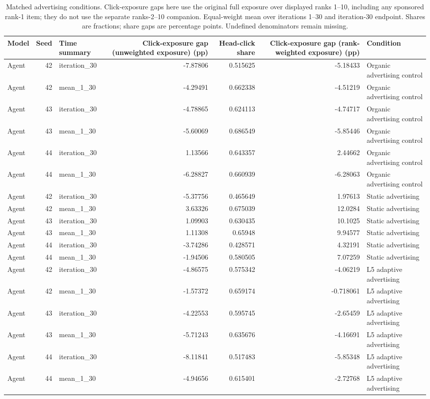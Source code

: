 \begin{table}[htbp!]
\centering
\small
\setlength{\tabcolsep}{3pt}
\renewcommand{\arraystretch}{1.1}
\begin{tabular}{lrlrrrl}
\hline
Model & Seed & Time summary & Click-exposure gap (unweighted exposure) (pp) & Head-click share & Click-exposure gap (rank-weighted exposure) (pp) & Condition \\
\hline
Agent & 42 & iteration\_30 & -7.87806 & 0.515625 & -5.18433 & Organic advertising control \\
Agent & 42 & mean\_1\_30 & -4.29491 & 0.662338 & -4.51219 & Organic advertising control \\
Agent & 43 & iteration\_30 & -4.78865 & 0.624113 & -4.74717 & Organic advertising control \\
Agent & 43 & mean\_1\_30 & -5.60069 & 0.686549 & -5.85446 & Organic advertising control \\
Agent & 44 & iteration\_30 & 1.13566 & 0.643357 & 2.44662 & Organic advertising control \\
Agent & 44 & mean\_1\_30 & -6.28827 & 0.660939 & -6.28063 & Organic advertising control \\
Agent & 42 & iteration\_30 & -5.37756 & 0.465649 & 1.97613 & Static advertising \\
Agent & 42 & mean\_1\_30 & 3.63326 & 0.675039 & 12.0284 & Static advertising \\
Agent & 43 & iteration\_30 & 1.09903 & 0.630435 & 10.1025 & Static advertising \\
Agent & 43 & mean\_1\_30 & 1.11308 & 0.65948 & 9.94577 & Static advertising \\
Agent & 44 & iteration\_30 & -3.74286 & 0.428571 & 4.32191 & Static advertising \\
Agent & 44 & mean\_1\_30 & -1.94506 & 0.580505 & 7.07259 & Static advertising \\
Agent & 42 & iteration\_30 & -4.86575 & 0.575342 & -4.06219 & L5 adaptive advertising \\
Agent & 42 & mean\_1\_30 & -1.57372 & 0.659174 & -0.718061 & L5 adaptive advertising \\
Agent & 43 & iteration\_30 & -4.22553 & 0.595745 & -2.65459 & L5 adaptive advertising \\
Agent & 43 & mean\_1\_30 & -5.71243 & 0.635676 & -4.16691 & L5 adaptive advertising \\
Agent & 44 & iteration\_30 & -8.11841 & 0.517483 & -5.85348 & L5 adaptive advertising \\
Agent & 44 & mean\_1\_30 & -4.94656 & 0.615401 & -2.72768 & L5 adaptive advertising \\
\hline
\end{tabular}
\caption{Matched advertising conditions. Click-exposure gaps here use the original full exposure over displayed ranks 1--10, including any sponsored rank-1 item; they do not use the separate ranks-2--10 companion. Equal-weight mean over iterations 1--30 and iteration-30 endpoint. Shares are fractions; share gaps are percentage points. Undefined denominators remain missing.}
\label{chap:results:tab:rq1_advertising_click_exposure}
\end{table}
